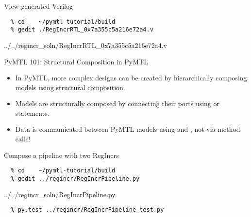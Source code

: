 \begin{task}\begin{frame}[fragile]{View generated Verilog}
\vspace{-0.25in}
\begin{verbatim}
  % cd    ~/pymtl-tutorial/build
  % gedit ./RegIncrRTL_0x7a355c5a216e72a4.v
\end{verbatim}

%
{../../regincr_soln/RegIncrRTL_0x7a355c5a216e72a4.v}

\end{frame}
\end{task}

\begin{frame}{PyMTL 101: Structural Composition in PyMTL}
\begin{itemize}
  \item In PyMTL, more complex designs can be created by hierarchically
        composing models using structural composition.
  \smallskip
  \item Models are structurally composed by connecting their ports using
         or  statements.
  \smallskip
  \item Data is communicated between PyMTL models using  and
        , not via method calls!
\end{itemize}
\end{frame}

\begin{task}\begin{frame}[fragile]{Compose a pipeline with two RegIncrs}
\vspace{-0.25in}
\begin{verbatim}
  % cd    ~/pymtl-tutorial/build
  % gedit ../regincr/RegIncrPipeline.py
\end{verbatim}

%
{../../regincr_soln/RegIncrPipeline.py}

\begin{verbatim}
  % py.test ../regincr/RegIncrPipeline_test.py
\end{verbatim}
\end{frame}
\end{task}

